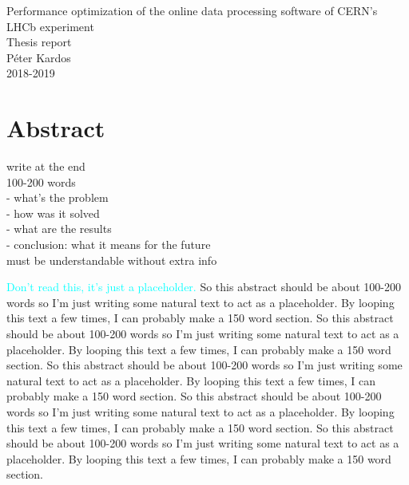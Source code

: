 \documentclass[12pt]{article}
\begin{document}
	
	
	\begin{center}
		\Huge Performance optimization of the online data processing software of CERN's LHCb experiment\\
		\Large Thesis report\\
		\vspace{1pc}
		\huge Péter Kardos \\
		\large 2018-2019
	\end{center}
	
	
	\section{Abstract}
	
	\color{red}
	write at the end \\
	100-200 words \\
	- what's the problem \\
	- how was it solved \\
	- what are the results \\
	- conclusion: what it means for the future \\
	must be understandable without extra info	
	\color{black}
	\vspace{1.5pc}
		
	\textcolor{cyan}{Don't read this, it's just a placeholder.}
	So this abstract should be about 100-200 words so I'm just writing some natural text to act as a placeholder. By looping this text a few times, I can probably make a 150 word section. So this abstract should be about 100-200 words so I'm just writing some natural text to act as a placeholder. By looping this text a few times, I can probably make a 150 word section. So this abstract should be about 100-200 words so I'm just writing some natural text to act as a placeholder. By looping this text a few times, I can probably make a 150 word section. So this abstract should be about 100-200 words so I'm just writing some natural text to act as a placeholder. By looping this text a few times, I can probably make a 150 word section. So this abstract should be about 100-200 words so I'm just writing some natural text to act as a placeholder. By looping this text a few times, I can probably make a 150 word section.
	
\end{document}
